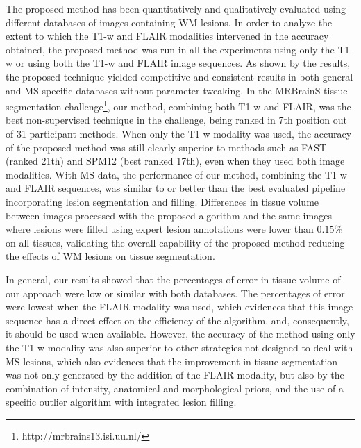 The proposed method has been quantitatively and qualitatively evaluated using different databases of images containing WM lesions. In order to analyze the extent to which the T1-w and FLAIR modalities intervened in the accuracy obtained, the proposed method was run in all the experiments using only the T1-w or using both the T1-w and FLAIR image sequences. As shown by the results, the proposed technique yielded competitive and consistent results in both general and MS specific databases without parameter tweaking. In the MRBrainS tissue segmentation challenge\footnote{http://mrbrains13.isi.uu.nl/}, our method, combining both T1-w and FLAIR, was the best non-supervised technique in the challenge, being ranked in 7th position out of 31 participant methods. When only the T1-w modality was used, the accuracy of the proposed method was still clearly superior to  methods such as FAST (ranked 21th) and SPM12 (best ranked 17th), even when they used both image modalities. With MS data, the performance of our method, combining the T1-w and FLAIR sequences, was similar to or better than the best evaluated pipeline incorporating lesion segmentation and filling. Differences in tissue volume between images processed with the proposed algorithm and the same images where lesions were filled using expert lesion annotations were lower than $0.15\%$ on all tissues, validating the overall capability of the proposed method reducing the effects of WM lesions on tissue segmentation. 

In general, our results showed that the percentages of error in tissue volume of our approach were low or similar with both databases. The percentages of error were lowest when the FLAIR modality was used, which evidences that this image sequence has a direct effect on the efficiency of the algorithm, and, consequently, it should be used when available. However, the accuracy of the method using only the T1-w modality was also superior to other strategies not designed to deal with MS lesions, which also evidences that the improvement in tissue segmentation was not only generated by the addition of the FLAIR modality, but also by the combination of intensity, anatomical and morphological priors, and the use of a specific outlier algorithm with integrated lesion filling.


